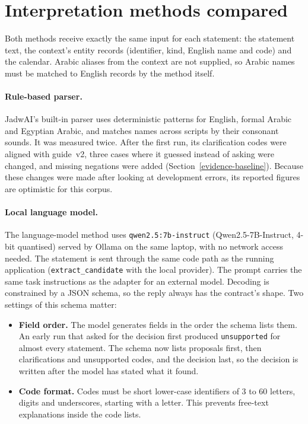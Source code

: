 \section{Interpretation methods compared}\label{baselines}

Both methods receive exactly the same input for each statement: the statement text, the context's entity records (identifier, kind, English name and code) and the calendar. Arabic aliases from the context are not supplied, so Arabic names must be matched to English records by the method itself.

\paragraph{Rule-based parser.} JadwAI's built-in parser uses deterministic patterns for English, formal Arabic and Egyptian Arabic, and matches names across scripts by their consonant sounds. It was measured twice. After the first run, its clarification codes were aligned with guide~v2, three cases where it guessed instead of asking were changed, and missing negations were added (Section~\ref{evidence-baseline}). Because these changes were made after looking at development errors, its reported figures are optimistic for this corpus.

\paragraph{Local language model.} The language-model method uses \texttt{qwen2.5:7b-instruct} (Qwen2.5-7B-Instruct, 4-bit quantised) served by Ollama on the same laptop, with no network access needed. The statement is sent through the same code path as the running application (\texttt{extract\_candidate} with the local provider). The prompt carries the same task instructions as the adapter for an external model. Decoding is constrained by a JSON schema, so the reply always has the contract's shape. Two settings of this schema matter:

\begin{itemize}
\item \textbf{Field order.} The model generates fields in the order the schema lists them. An early run that asked for the decision first produced \texttt{unsupported} for almost every statement. The schema now lists proposals first, then clarifications and unsupported codes, and the decision last, so the decision is written after the model has stated what it found.
\item \textbf{Code format.} Codes must be short lower-case identifiers of 3 to 60 letters, digits and underscores, starting with a letter. This prevents free-text explanations inside the code lists.
\end{itemize}


